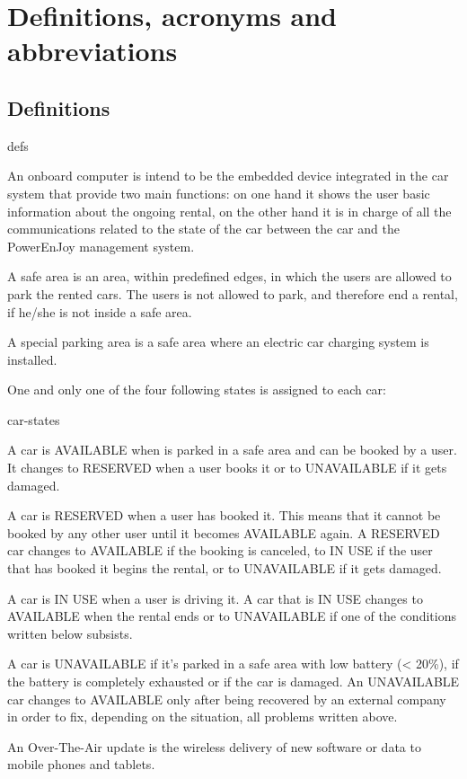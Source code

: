 \section{Definitions, acronyms and abbreviations}

\subsection{Definitions}
	\begin{labeling}{defs}
		\item[\textbf{Onboard computer}] An onboard computer is intend to be the embedded device integrated in the car system that provide two main functions: on one hand it shows the user basic information about the ongoing rental, on the other hand it is in charge of all the communications related to the state of the car between the car and the PowerEnJoy management system.
		\item[\textbf{Safe area}] A safe area is an area, within predefined edges, in which the users are allowed to park the rented cars. The users is not allowed to park, and therefore end a rental, if he/she is not inside a safe area.
		\item[\textbf{Special parking area}] A special parking area is a safe area where an electric car charging system is installed.
		\item[\textbf{Car states}] One and only one of the four following states is assigned to each car:
			\begin{labeling}{car-states}
				\item[\textbf{AVAILABLE}] A car is AVAILABLE when is parked in a safe area and can be booked by a user. It changes to RESERVED when a user books it or to UNAVAILABLE if it gets damaged.
				\item[\textbf{RESERVED}] A car is RESERVED when a user has booked it. This means that it cannot be booked by any other user until it becomes AVAILABLE again. A RESERVED car changes to AVAILABLE if the booking is canceled, to IN USE if the user that has booked it begins the rental, or to UNAVAILABLE if it gets damaged.
				\item[\textbf{IN USE}] A car is IN USE when a user is driving it. A car that is IN USE changes to AVAILABLE when the rental ends or to UNAVAILABLE if one of the conditions written below subsists.
				\item[\textbf{UNAVAILABLE}] A car is UNAVAILABLE if it's parked in a safe area with low battery (< 20\%), if the battery is completely exhausted or if the car is damaged. An UNAVAILABLE car changes to AVAILABLE only after being recovered by an external company in order to fix, depending on the situation, all problems written above.
			\end{labeling}
		\item[\textbf{Over-The-Air updates}] An Over-The-Air update is the wireless delivery of new software or data to mobile phones and tablets.
	\end{labeling}

